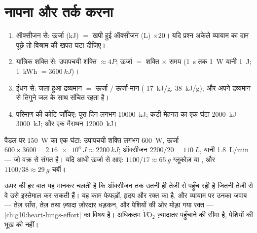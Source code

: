 \section{नापना और तर्क करना}

\begin{method}[व्यायाम के लिए ऊर्जा की गणना]\label{met:g10:exercise-and-energy:calc}
\begin{enumerate}
  \item ऑक्सीजन से: ऊर्जा (\unit{kJ}) $=$ खपी हुई ऑक्सीजन (\unit{L})
        $\times 20$। यदि प्रश्न अकेले व्यायाम का दाम पूछे तो विश्राम की
        खपत घटा दीजिए।
  \item यांत्रिक शक्ति से: उपापचयी शक्ति $\approx 4 P$; ऊर्जा $=$ शक्ति
        $\times$ समय (\qty{1}{s} तक \qty{1}{W} यानी \qty{1}{J};
        \qty{1}{kWh} $= \qty{3600}{kJ}$)।
  \item ईंधन से: जला हुआ द्रव्यमान $=$ ऊर्जा $/$ ऊर्जा-मान
        ( \qty{17}{kJ/g},  \qty{38}{kJ/g}); और
         अपने द्रव्यमान से तिगुने जल के साथ संचित रहता है।
  \item परिमाण की कोटि जाँचिए: पूरा दिन लगभग \qty{10000}{kJ}; कड़ी
        मेहनत का एक घंटा \qtyrange{2000}{3000}{kJ}; और एक मैराथन
        \qty{12000}{kJ}।
\end{enumerate}
\end{method}

\begin{example}[साइकिल का एक घंटा]\label{ex:g10:exercise-and-energy:hour}
पैडल पर \qty{150}{W} का एक घंटा: उपापचयी शक्ति लगभग \qty{600}{W}, ऊर्जा
$600 \times 3600 = \qty{2.16e6}{J} \approx
\qty{2200}{kJ}$; ऑक्सीजन $2200/20 = \qty{110}{L}$, यानी \qty{1.8}{L/min}
--- जो वक्र से संगत है। यदि आधी ऊर्जा  से आए:
$1100/17 \approx \qty{65}{g}$ ग्लूकोज़ या , और
$1100/38 \approx \qty{29}{g}$ चर्बी।
\end{example}

\begin{remark}[ऑक्सीजन का पहुँचना क्यों ज़रूरी है]\label{rem:g10:exercise-and-energy:delivery}
ऊपर की हर बात यह मानकर चलती है कि ऑक्सीजन  तक उतनी ही तेज़ी
से पहुँच रही है जितनी तेज़ी से वे उसे इस्तेमाल कर सकती हैं। यह काम
फेफड़ों, हृदय और रक्त का है, और व्यायाम पर उनका जवाब --- तेज़ साँस, तेज़
तथा ज़्यादा ज़ोरदार धड़कन, और पेशियों की ओर मोड़ा गया रक्त ---
\cref{ch:g10:heart-lungs-effort} का विषय है। अधिकतम
$\dot V\!\mathrm{O_2}$ ज़्यादातर पहुँचाने की सीमा है, पेशियों की भूख की
नहीं।
\end{remark}

